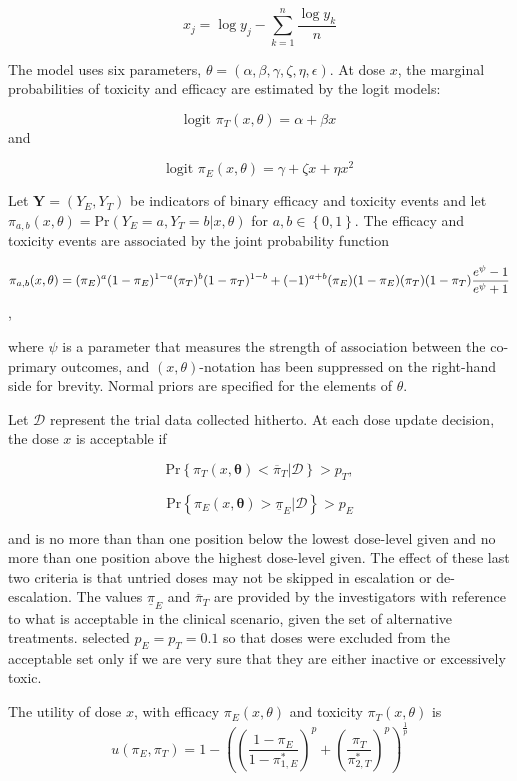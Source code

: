\documentclass[article]{jss}
\begin{document}
\[x_j = \log{y_j} - \sum_{k=1}^n \frac{\log{y_k}}{n}\]

The model uses six parameters,
\(\theta = (\alpha, \beta, \gamma, \zeta, \eta, \epsilon)\). At dose
\(x\), the marginal probabilities of toxicity and efficacy are estimated
by the logit models:

\[\text{logit } \pi_T(x, \theta) = \alpha + \beta x\] and

\[\text{logit } \pi_E(x, \theta) = \gamma + \zeta x + \eta x^2\]

Let \(\boldsymbol{Y} = (Y_E, Y_T)\) be indicators of binary efficacy and
toxicity events and let
\(\pi_{a, b}(x, \theta) = \text{Pr}(Y_E = a, Y_T = b | x, \theta)\) for
\(a, b \in \left\{ 0, 1\right\}\). The efficacy and toxicity events are
associated by the joint probability function

\[\pi_{a,b}(x, \theta) = (\pi_E)^a (1-\pi_E)^{1-a} (\pi_T)^b (1-\pi_T)^{1-b} + \\ (-1)^{a+b} (\pi_E) (1-\pi_E) (\pi_T) (1-\pi_T) \frac{e^\psi-1}{e^\psi+1}\],

where \(\psi\) is a parameter that measures the strength of association
between the co-primary outcomes, and \((x, \theta)\)-notation has been
suppressed on the right-hand side for brevity. Normal priors are
specified for the elements of \(\theta\).

Let \(\mathcal{D}\) represent the trial data collected hitherto. At each
dose update decision, the dose \(x\) is acceptable if

\[\text{Pr}\left\{ \pi_T(x, \boldsymbol{\theta}) < \overline{\pi}_T | \mathcal{D} \right\} > p_T,\]

\[\text{Pr}\left\{ \pi_E(x, \boldsymbol{\theta}) > \underline{\pi}_E | \mathcal{D} \right\} > p_E\]

and is no more than than one position below the lowest dose-level given
and no more than one position above the highest dose-level given. The
effect of these last two criteria is that untried doses may not be
skipped in escalation or de-escalation. The values \(\underline{\pi}_E\)
and \(\overline{\pi}_T\) are provided by the investigators with
reference to what is acceptable in the clinical scenario, given the set
of alternative treatments. \citet{Thall2004} selected
\(p_E = p_T = 0.1\) so that doses were excluded from the acceptable set
only if we are very sure that they are either inactive or excessively
toxic.

The utility of dose \(x\), with efficacy \(\pi_E(x, \theta)\) and
toxicity \(\pi_T(x, \theta)\) is
\[u(\pi_E, \pi_T) = 1 - \left( \left(\frac{1-\pi_E}{1-\pi_{1,E}^*}\right)^p + \left(\frac{\pi_T}{\pi_{2,T}^*}\right)^p \right) ^ \frac{1}{p}\]
\end{document}

